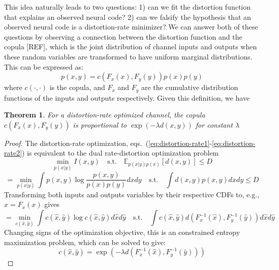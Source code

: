 \documentclass[10pt]{article}      %
\newcommand{\st}{\mathrm{s.t.}}
\newtheorem{theorem}{Theorem}
\begin{document}
This idea naturally leads to two questions:
1) can we fit the distortion function that explains an observed neural code?
2) can we falsify the hypothesis that an observed neural code is a distortion-rate minimizer?
We can answer both of these questions by observing a connection between the distortion function and the copula [REF], which is the joint distribution of channel inputs and outputs when these random variables are transformed to have uniform marginal distributions.
This can be expressed as:
\begin{equation}
  p(x, y) = c(F_x(x), F_y(y))p(x)p(y)
\end{equation}
where $c(\cdot, \cdot)$ is the copula, and $F_x$ and $F_y$ are the cumulative distribution functions of the inputs and outputs respectively.
Given this definition, we have

\begin{theorem}
  For a distortion-rate optimized channel, the copula $c(F_x(x), F_y(y))$ is proportional to $\exp(-\lambda d(x, y))$ for constant $\lambda$
\end{theorem}
\begin{proof}
  The distortion-rate optimization, eqs.~(\ref{eq:distortion-rate1}-\ref{eq:distortion-rate2}) is equivalent to the dual rate-distortion optimization problem
  \begin{equation}
    \min_{p(x|y)} I(x, y) \quad \st \quad \mathbb{E}_{p(x|y) p(x)}[d(x, y)] \le D
  \end{equation}
  \begin{equation}
    = \min_{p(x|y)} \int p(x,y) \log \frac{p(x,y)}{p(x)p(y)} dxdy \quad \st \quad \int d(x, y) p(x,y) dx dy \le D
  \end{equation}
  Transforming both inputs and outputs variables by their respective CDFs to, e.g., $\hat x = F_x(x)$ gives
  \begin{equation}
    = \min_{c(\hat x, \hat y)} \int c(\hat x, \hat y) \log c(\hat x, \hat y) d \hat x d \hat y \quad \st \quad \int c(\hat x, \hat y) d(F_x^{-1}(\hat x), F_y^{-1}(\hat y)) d \hat x d \hat y
  \end{equation}
  Changing signs of the optimization objective, this is an constrained entropy maximization problem, which can be solved to give:
  \begin{equation}
    c(\hat x, \hat y) = \exp(-\lambda d(F_x^{-1}(\hat x), F_y^{-1}(\hat y)))
  \end{equation}

\end{proof}
\end{document}

